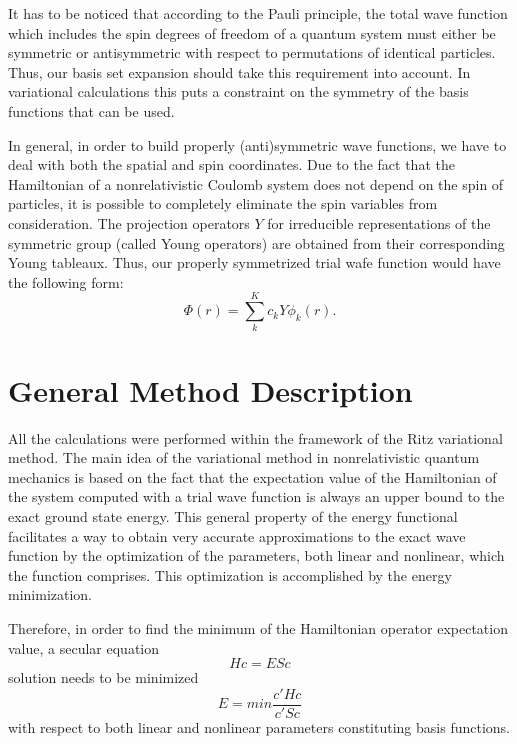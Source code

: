 It has to be noticed that according to the Pauli principle, the total wave function
which includes the spin degrees of freedom of a quantum system must either be symmetric 
or antisymmetric with respect to permutations of identical particles. 
Thus, our basis set expansion should take this requirement into account. 
In variational calculations this puts a constraint on the symmetry of the basis 
functions that can be used. 

In general, in order to build properly (anti)symmetric wave functions, we have to deal 
with both the spatial and spin coordinates. Due to the fact that the Hamiltonian of a
nonrelativistic Coulomb system does not depend on the spin of particles, it is possible 
to completely eliminate the spin variables from consideration. The projection operators
$Y$ for irreducible representations of the symmetric group (called Young operators) are 
obtained from their corresponding Young tableaux. Thus, our properly symmetrized 
trial wafe function would have the following form:
\begin{equation}
\Phi (r) = \sum_k^{K} c_k Y \phi_k(r).
\label{wf_perm}
\end{equation}



\section{General Method Description}

All the calculations were performed within the framework of the Ritz variational method. 
The main idea of the variational method in nonrelativistic quantum mechanics is based on 
the fact that the expectation value of the Hamiltonian of the system computed with a
trial wave function is always an upper bound to the exact ground state energy. 
This general property of the energy functional facilitates a way to obtain very accurate
approximations to the exact wave function by the optimization of the parameters, 
both linear and nonlinear, which the function comprises. This optimization is accomplished 
by the energy minimization. 

Therefore, in order to find the minimum of the Hamiltonian operator expectation value,
a secular equation 
\begin{equation}
Hc = ESc
\end{equation}
solution needs to be minimized 
\begin{equation}
E = min\frac{c'Hc}{c'Sc}
\end{equation}
with respect to both linear and nonlinear parameters constituting basis functions.


